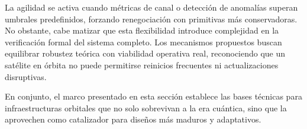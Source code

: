 La agilidad se activa cuando métricas de canal o detección de anomalías superan umbrales predefinidos, forzando renegociación con primitivas más conservadoras. No obstante, cabe matizar que esta flexibilidad introduce complejidad en la verificación formal del sistema completo. Los mecanismos propuestos buscan equilibrar robustez teórica con viabilidad operativa real, reconociendo que un satélite en órbita no puede permitirse reinicios frecuentes ni actualizaciones disruptivas.

En conjunto, el marco presentado en esta sección establece las bases técnicas para infraestructuras orbitales que no solo sobrevivan a la era cuántica, sino que la aprovechen como catalizador para diseños más maduros y adaptativos.